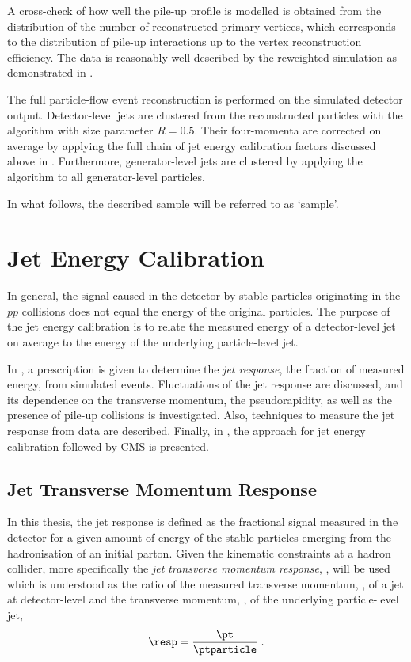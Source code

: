 A cross-check of how well the pile-up profile is modelled is obtained from the distribution of the number of reconstructed primary vertices, which corresponds to the distribution of pile-up interactions up to the vertex reconstruction efficiency.
The data is reasonably well described by the reweighted simulation as demonstrated in .

The full particle-flow event reconstruction is performed on the simulated detector output.
Detector-level jets are clustered from the reconstructed particles with the \antikt algorithm with size parameter \mbox{$R=0.5$}.
Their four-momenta are corrected on average by applying the full chain
of jet energy calibration factors discussed above in
.
Furthermore, generator-level jets are clustered by applying the algorithm to all generator-level particles.

In what follows, the described sample will be referred to as `\pythia sample'.


\section{Jet Energy Calibration} \label{sec:Jets:JEC}
In general, the signal caused in the detector by stable particles originating in the $pp$ collisions does not equal the energy of the original particles.
The purpose of the jet energy calibration is to relate the measured energy of a detector-level jet on average to the energy of the underlying particle-level jet.

In , a prescription is given to determine the \textit{jet response}, \ie the fraction of measured energy, from simulated events.
Fluctuations of the jet response are discussed, and its dependence on the transverse momentum, the pseudorapidity, as well as the presence of pile-up collisions is investigated.
Also, techniques to measure the jet response from data are described.
Finally, in , the approach for jet energy calibration followed by CMS is presented.


\subsection{Jet Transverse Momentum Response} \label{sec:Jets:JEC:Response}
In this thesis, the jet response is defined as the fractional signal measured in the detector for a given amount of energy of the stable particles emerging from the hadronisation of an initial parton.
Given the kinematic constraints at a hadron collider, more specifically the \textit{jet transverse momentum response}, \resp, will be used which is understood as the ratio of the measured transverse momentum, \pt, of a jet at detector-level and the transverse momentum, \ptparticle, of the underlying particle-level jet,
\begin{equation}
  \label{eq:Jets:ResponseDefinition}
  \resp = \frac{\pt}{\ptparticle} \;.
\end{equation}

